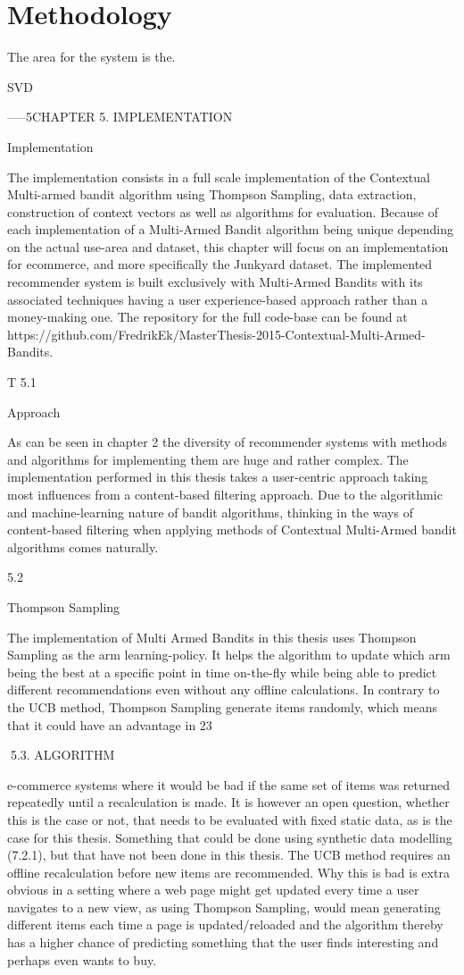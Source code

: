\chapter{Methodology}
The area for the system is the.

SVD



-----5CHAPTER 5. IMPLEMENTATION

Implementation

The implementation consists in a full scale implementation of the Contextual
Multi-armed bandit algorithm using Thompson Sampling, data extraction,
construction of context vectors as well as algorithms for evaluation. Because of
each implementation of a Multi-Armed Bandit algorithm being unique depending on the actual use-area and dataset, this chapter will focus on an implementation for ecommerce, and more specifically the Junkyard dataset. The implemented recommender
system is built exclusively with Multi-Armed Bandits with its associated techniques
having a user experience-based approach rather than a money-making one. The repository for the full code-base can be found at https://github.com/FredrikEk/MasterThesis-2015-Contextual-Multi-Armed-Bandits.

T
5.1

Approach

As can be seen in chapter 2 the diversity of recommender systems with methods and
algorithms for implementing them are huge and rather complex. The implementation
performed in this thesis takes a user-centric approach taking most influences from a
content-based filtering approach. Due to the algorithmic and machine-learning nature
of bandit algorithms, thinking in the ways of content-based filtering when applying
methods of Contextual Multi-Armed bandit algorithms comes naturally.

5.2

Thompson Sampling

The implementation of Multi Armed Bandits in this thesis uses Thompson Sampling
as the arm learning-policy. It helps the algorithm to update which arm being the best
at a specific point in time on-the-fly while being able to predict different recommendations even without any offline calculations. In contrary to the UCB method, Thompson
Sampling generate items randomly, which means that it could have an advantage in
23

5.3. ALGORITHM


e-commerce systems where it would be bad if the same set of items was returned repeatedly until a recalculation is made. It is however an open question, whether this is the
case or not, that needs to be evaluated with fixed static data, as is the case for this thesis. Something that could be done using synthetic data modelling (7.2.1), but that have
not been done in this thesis. The UCB method requires an offline recalculation before
new items are recommended. Why this is bad is extra obvious in a setting where a web
page might get updated every time a user navigates to a new view, as using Thompson
Sampling, would mean generating different items each time a page is updated/reloaded
and the algorithm thereby has a higher chance of predicting something that the user
finds interesting and perhaps even wants to buy.

